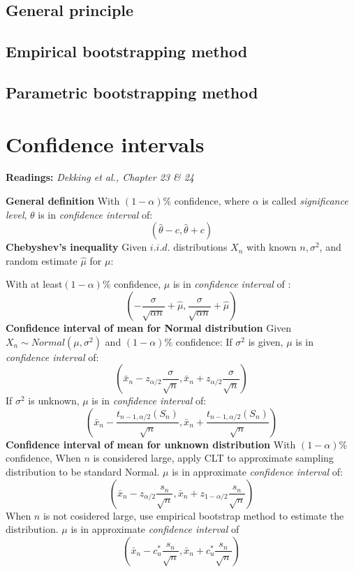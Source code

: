 \documentclass[a4paper]{article}
\begin{document}
\subsection{General principle}
\subsection{Empirical bootstrapping method}
\subsection{Parametric bootstrapping method}

\newpage
\section{Confidence intervals}
\textbf{Readings:} \textit{Dekking et al., Chapter 23 \& 24}
\begin{mdframed}[style=Summary]
    \textbf{General definition}
    \newline
    With $(1-\alpha)\%$ confidence, where $\alpha$ is called \textit{significance level}, 
    \newline
    $\theta$ is in \textit{confidence interval} of:
    $$(\hat{\theta} -c, \hat{\theta} +c)$$
    \newline
    \textbf{Chebyshev's inequality}
    \newline
    Given $i.i.d.$ distributions $X_n$ with known $n, \sigma^2$, and random estimate $\hat{\mu}$ for $\mu$:
    
    With at least$(1-\alpha)\%$ confidence, $\mu$ is in \textit{confidence interval} of :
    $$(-\frac{\sigma}{\sqrt{\alpha n}}+\hat{\mu}, \frac{\sigma}{\sqrt{\alpha n}}+\hat{\mu})$$
    \newline
    \textbf{Confidence interval of mean for Normal distribution}
    \newline
    Given $X_n\sim Normal(\mu, \sigma^2)$ and $(1-\alpha)\%$ confidence:
    \newline
    If $\sigma^2$ is given, $\mu$ is in \textit{confidence interval} of:
    $$(\bar{x}_n -z_{\alpha/2}\frac{\sigma}{\sqrt{n}}, \bar{x}_n +z_{\alpha/2}\frac{\sigma}{\sqrt{n}})$$
    \newline
    If $\sigma^2$ is unknown, $\mu$ is in \textit{confidence interval} of:
    $$(\bar{x}_n -\frac{ t_{n-1,\alpha/2}(S_n)}{\sqrt{n}}, \bar{x}_n +\frac{ t_{n-1,\alpha/2}(S_n)}{\sqrt{n}})$$
    \newline
    \textbf{Confidence interval of mean for unknown distribution}
    \newline
    With $(1-\alpha)\%$ confidence,
    \newline
    When $n$ is considered large, apply CLT to approximate sampling distribution to be standard Normal.
    $\mu$ is in approximate \textit{confidence interval} of:
    $$(\bar{x}_n -z_{\alpha/2}\frac{s_n}{\sqrt{n}}, \bar{x}_n +z_{1-\alpha/2}\frac{s_n}{\sqrt{n}})$$
    \newline
    When $n$ is not cosidered large, use empirical bootstrap method to estimate the distribution.
    $\mu$ is in approximate \textit{confidence interval} of $$(\bar{x}_n -c^{*}_{u}\frac{s_n}{\sqrt{n}}, \bar{x}_n +c^{*}_{u}\frac{s_n}{\sqrt{n}})$$
\end{mdframed}
\end{document}
